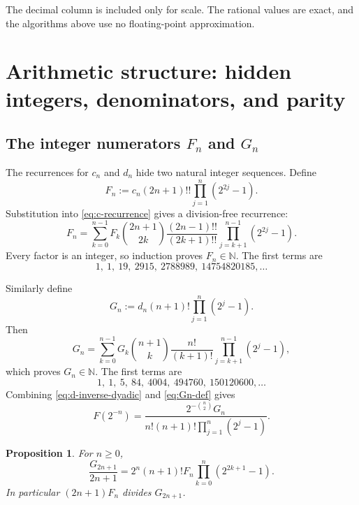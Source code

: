 \documentclass[11pt]{article}
\numberwithin{equation}{section}
\newtheorem{proposition}[theorem]{Proposition}
\theoremstyle{definition}
\theoremstyle{remark}
\newcommand{\N}{\mathbb N}
\begin{document}
The decimal column is included only for scale.  The rational values are exact, and the algorithms above use no floating-point approximation.


\section{Arithmetic structure: hidden integers, denominators, and parity}\label{sec:arithmetic}

\subsection{The integer numerators $F_n$ and $G_n$}

The recurrences for $c_n$ and $d_n$ hide two natural integer sequences.  Define
\begin{equation}\label{eq:Fn-def}
 F_n:=c_n(2n+1)!!\prod_{j=1}^{n}(2^{2j}-1).
\end{equation}
Substitution into \eqref{eq:c-recurrence} gives a division-free recurrence:
\begin{equation}\label{eq:Fn-recurrence}
 F_n=\sum_{k=0}^{n-1}F_k\binom{2n+1}{2k}
 \frac{(2n-1)!!}{(2k+1)!!}
 \prod_{j=k+1}^{n-1}(2^{2j}-1).
\end{equation}
Every factor is an integer, so induction proves $F_n\in\N$.  The first terms are
\begin{equation}\label{eq:Fn-values}
 1,\ 1,\ 19,\ 2915,\ 2788989,\ 14754820185,\ldots
\end{equation}

Similarly define
\begin{equation}\label{eq:Gn-def}
 G_n:=d_n(n+1)!\prod_{j=1}^{n}(2^j-1).
\end{equation}
Then
\begin{equation}\label{eq:Gn-recurrence}
 G_n=\sum_{k=0}^{n-1}G_k\binom{n+1}{k}
 \frac{n!}{(k+1)!}\prod_{j=k+1}^{n-1}(2^j-1),
\end{equation}
which proves $G_n\in\N$.  The first terms are
\begin{equation}\label{eq:Gn-values}
 1,\ 1,\ 5,\ 84,\ 4004,\ 494760,\ 150120600,\ldots
\end{equation}
Combining \eqref{eq:d-inverse-dyadic} and \eqref{eq:Gn-def} gives
\begin{equation}\label{eq:F-inverse-Gn}
 F(2^{-n})=
 \frac{2^{-\binom n2}G_n}
 {n!(n+1)!\displaystyle\prod_{j=1}^{n}(2^j-1)}.
\end{equation}

\begin{proposition}\label{prop:F-G-relation}
For $n\ge0$,
\begin{equation}\label{eq:F-G-relation}
 \frac{G_{2n+1}}{2n+1}
 =2^n(n+1)!F_n\prod_{k=0}^{n}(2^{2k+1}-1).
\end{equation}
In particular $(2n+1)F_n$ divides $G_{2n+1}$.
\end{proposition}
\end{document}
